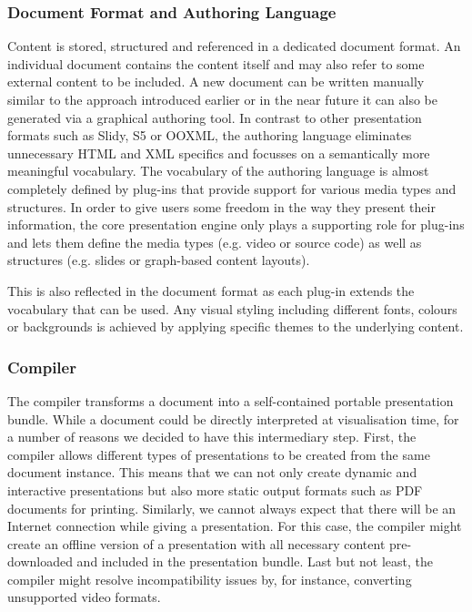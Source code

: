     \subsubsection{Document Format and Authoring Language}

     Content is stored, structured and referenced in a dedicated \mxp document
     format. An individual \mxp document contains the content itself and may
     also refer to some external content to be included. A new \mxp document
     can be written manually similar to the \latex approach introduced earlier
     or in the near future it can also be generated via a graphical authoring
     tool. In contrast to other presentation formats such as Slidy, S5 or
     OOXML, the authoring language eliminates unnecessary HTML and XML
     specifics and focusses on a semantically more meaningful vocabulary. The
     vocabulary of the authoring language is almost completely defined by
     plug-ins that provide support for various media types and structures. In
     order to give users some freedom in the way they present their
     information, the core \mxp presentation engine only plays a supporting
     role for plug-ins and lets them define the media types (e.g. video or
     source code) as well as structures (e.g. slides or graph-based content
     layouts).

     This is also reflected in the document format as each plug-in extends the
     vocabulary that can be used. Any visual styling including different fonts,
     colours or backgrounds is achieved by applying specific themes to the
     underlying content.

    \subsubsection{Compiler}

     The compiler transforms a \mxp document into a self-contained portable
     \mxp presentation bundle. While a \mxp document could be directly interpreted
     at visualisation time, for a number of reasons we decided to have this
     intermediary step. First, the compiler allows different types of presentations
     to be created from the same \mxp document instance. This means that we can not
     only create dynamic and interactive presentations but also more static output
     formats such as PDF documents for printing. Similarly, we cannot always expect
     that there will be an Internet connection while giving a presentation. For this
     case, the compiler might create an offline version of a presentation with all
     necessary content pre-downloaded and included in the \mxp presentation bundle.
     Last but not least, the compiler might resolve incompatibility issues by, for
     instance, converting unsupported video formats.

